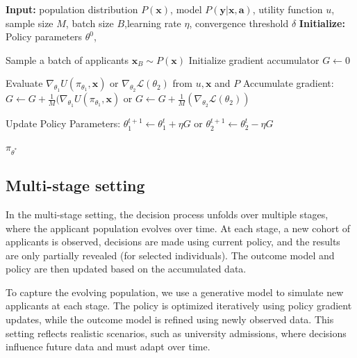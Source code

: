 \documentclass[acmlarge]{acmart-ecaf}
\newcommand {\Pfeat} {\mathbf{x}}
\newcommand {\pol} {\pi}
\newcommand {\Pact} {\mathbf{a}}
\newcommand {\Pout} {\mathbf{y}}
\begin{document}
\begin{algorithm}[H]
\caption{Policy Gradient for single-shot setting}
\label{alg:sg_fixed}
\begin{algorithmic}[1]
\State \textbf{Input:}  population distribution $P(\Pfeat)$, model $P(\Pout|\Pfeat, \Pact)$, utility function $u$, sample size $M$, batch size $B$,learning rate $\eta$, convergence threshold $\delta$
\State \textbf{Initialize:} Policy parameters $\theta^0$, 

    \State Sample a batch of applicants $\Pfeat_B \sim P(\Pfeat)$ 
    \State Initialize gradient accumulator $G \leftarrow 0$
    
     
        \State Evaluate $\nabla_{\theta_1} U(\pol_{\theta_1}, \Pfeat)$ or $\nabla_{\theta_2} \mathcal{L}(\theta_2)$ from $u, \Pfeat$ and $P$
        \State Accumulate gradient: $G \leftarrow G + \frac{1}{M} ( \nabla_{\theta_1} U(\pol_{\theta_1}, \Pfeat)$ or $G \leftarrow G + \frac{1}{M} ( \nabla_{\theta_2} \mathcal{L}(\theta_2))$
    \EndFor
    
    \State Update Policy Parameters: 
    $\theta^{t+1}_1 \leftarrow \theta^t_1 + \eta G$ or $\theta^{t+1}_2 \leftarrow \theta^t_2 - \eta G$
    
\EndWhile
\State \Return $\pi_{\theta^*}$
\end{algorithmic}
\end{algorithm}

\subsection{Multi-stage setting}

In the multi-stage setting, the decision process unfolds over multiple stages, where the applicant population evolves over time. At each stage, a new cohort of applicants is observed, decisions are made using current policy, and the results are only partially revealed (for selected individuals). The outcome model and policy are then updated based on the accumulated data. 

To capture the evolving population, we use a generative model to simulate new applicants at each stage. The policy is optimized iteratively using policy gradient updates, while the outcome model is refined using newly observed data. This setting reflects realistic scenarios, such as university admissions, where decisions influence future data and must adapt over time.
\end{document}
